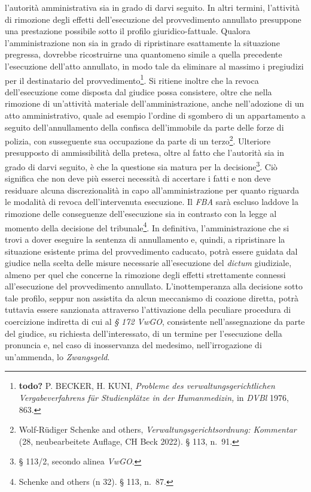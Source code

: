 \documentclass[12pt,it,a4paper,]{report}
\begin{document}
l'autorità amministrativa sia in grado di darvi seguito. In altri
termini, l'attività di rimozione degli effetti dell'esecuzione del
provvedimento annullato presuppone una prestazione possibile sotto il
profilo giuridico-fattuale. Qualora l'amministrazione non sia in grado
di ripristinare esattamente la situazione pregressa, dovrebbe
ricostruirne una quantomeno simile a quella precedente l'esecuzione
dell'atto annullato, in modo tale da eliminare al massimo i pregiudizi
per il destinatario del provvedimento\footnote{\textbf{todo?} P. BECKER,
  H. KUNI, \emph{Probleme des verwaltungsgerichtlichen Vergabeverfahrens
  für Studienplätze in der Humanmedizin,} in \emph{DVBl} 1976, 863.}. Si
ritiene inoltre che la revoca dell'esecuzione come disposta dal giudice
possa consistere, oltre che nella rimozione di un'attività materiale
dell'amministrazione, anche nell'adozione di un atto amministrativo,
quale ad esempio l'ordine di sgombero di un appartamento a seguito
dell'annullamento della confisca dell'immobile da parte delle forze di
polizia, con susseguente sua occupazione da parte di un
terzo\footnote{{Wolf-Rüdiger Schenke and others,
  \emph{Verwaltungsgerichtsordnung: Kommentar} (28, neubearbeitete
  Auflage, CH Beck 2022).} § 113, n.~91.}. Ulteriore presupposto di
ammissibilità della pretesa, oltre al fatto che l'autorità sia in grado
di darvi seguito, è che la questione sia matura per la
decisione\footnote{§ 113/2, secondo alinea \emph{VwGO}.}. Ciò significa
che non deve più esserci necessità di accertare i fatti e non deve
residuare alcuna discrezionalità in capo all'amministrazione per quanto
riguarda le modalità di revoca dell'intervenuta esecuzione. Il
\emph{FBA} sarà escluso laddove la rimozione delle conseguenze
dell'esecuzione sia in contrasto con la legge al momento della decisione
del tribunale\footnote{{Schenke and others (n 32).} § 113, n.~87.}. In
definitiva, l'amministrazione che si trovi a dover eseguire la sentenza
di annullamento e, quindi, a ripristinare la situazione esistente prima
del provvedimento caducato, potrà essere guidata dal giudice nella
scelta delle misure necessarie all'esecuzione del \emph{dictum}
giudiziale, almeno per quel che concerne la rimozione degli effetti
strettamente connessi all'esecuzione del provvedimento annullato.
L'inottemperanza alla decisione sotto tale profilo, seppur non assistita
da alcun meccanismo di coazione diretta, potrà tuttavia essere
sanzionata attraverso l'attivazione della peculiare procedura di
coercizione indiretta di cui al \emph{§ 172 VwGO}, consistente
nell'assegnazione da parte del giudice, su richiesta dell'interessato,
di un termine per l'esecuzione della pronuncia e, nel caso di
inosservanza del medesimo, nell'irrogazione di un'ammenda, lo
\emph{Zwangsgeld}.
\end{document}
